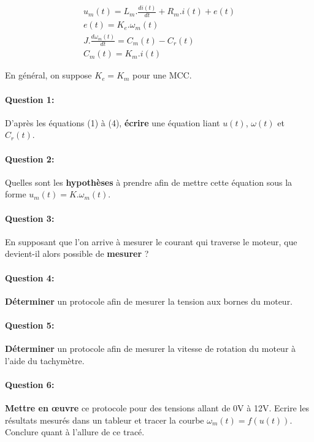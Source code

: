 




\begin{eqnarray}
u_m(t)=L_m.\frac{di(t)}{dt}+R_m.i(t)+e(t) \\
e(t)=K_e.\omega_m(t) \\
J.\frac{d\omega_m(t)}{dt}=C_m(t)-C_r(t) \\
C_m(t)=K_m.i(t)
\end{eqnarray}

En général, on suppose $K_e=K_m$ pour une MCC.

\paragraph{Question 1:} D'après les équations (1) à (4), \textbf{écrire} une équation liant $u(t)$, $\omega(t)$ et $C_r(t)$.

\paragraph{Question 2:} Quelles sont les \textbf{hypothèses} à prendre afin de mettre cette équation sous la forme $u_m(t)=K.\omega_m(t)$.

\paragraph{Question 3:} En supposant que l'on arrive à mesurer le courant qui traverse le moteur, que devient-il alors possible de \textbf{mesurer} ?


\paragraph{Question 4:} \textbf{Déterminer} un protocole afin de mesurer la tension aux bornes du moteur.

\paragraph{Question 5:} \textbf{Déterminer} un protocole afin de mesurer la vitesse de rotation du moteur à l'aide du tachymètre.

\paragraph{Question 6:} \textbf{Mettre en \oe uvre} ce protocole pour des tensions allant de 0V à 12V. Ecrire les résultats mesurés dans un tableur et tracer la courbe $\omega_m(t)=f(u(t))$. Conclure quant à l'allure de ce tracé.

